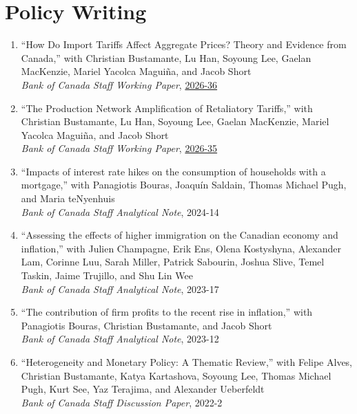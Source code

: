 \documentclass[11pt]{article}
\begin{document}
\section{Policy Writing}
\begin{enumerate}[leftmargin=*,labelindent=0em,labelsep=0em,itemindent=-10pt]
	\item ``How Do Import Tariffs Affect Aggregate Prices? Theory and Evidence from Canada,'' with Christian Bustamante, Lu Han, Soyoung Lee, Gaelan MacKenzie, Mariel Yacolca Maguiña, and Jacob Short\\[0.5em]
	\textit{Bank of Canada Staff Working Paper}, \href{https://www.bankofcanada.ca/2026/10/staff-working-paper-2026-36/}{2026-36}
	\item ``The Production Network Amplification of Retaliatory Tariffs,'' with Christian Bustamante, Lu Han, Soyoung Lee, Gaelan MacKenzie, Mariel Yacolca Maguiña, and Jacob Short\\[0.5em]
	\textit{Bank of Canada Staff Working Paper}, \href{https://www.bankofcanada.ca/2026/10/staff-working-paper-2026-35/}{2026-35}
	\item ``Impacts of interest rate hikes on the consumption of households with a mortgage,'' with Panagiotis Bouras, Joaquín Saldain, Thomas Michael Pugh, and Maria teNyenhuis\\[0.5em]
	\textit{Bank of Canada Staff Analytical Note}, 2024-14
	\item ``Assessing the effects of higher immigration on the Canadian economy and inflation,'' with Julien Champagne, Erik Ens, Olena Kostyshyna, Alexander Lam, Corinne Luu, Sarah Miller, Patrick Sabourin, Joshua Slive, Temel Taskin, Jaime Trujillo, and Shu Lin Wee \\[0.5em]
	\textit{Bank of Canada Staff Analytical Note}, 2023-17
	\item ``The contribution of firm profits to the recent rise in inflation,'' with Panagiotis Bouras, Christian Bustamante, and Jacob Short\\[0.5em]
	\textit{Bank of Canada Staff Analytical Note}, 2023-12
	\item ``Heterogeneity and Monetary Policy: A Thematic Review,'' with Felipe Alves, Christian Bustamante, Katya Kartashova, Soyoung Lee, Thomas Michael Pugh, Kurt See, Yaz Terajima, and Alexander Ueberfeldt\\[0.5em]
	\textit{Bank of Canada Staff Discussion Paper}, 2022-2
\end{enumerate}

\end{document}
